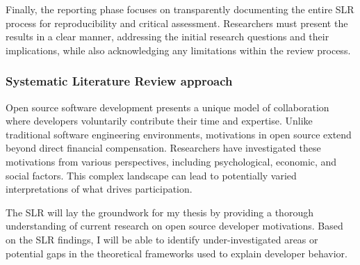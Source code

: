 Finally, the reporting phase focuses on transparently documenting the entire SLR process for reproducibility and critical assessment. Researchers must present the results in a clear manner, addressing the initial research questions and their implications, while also acknowledging any limitations within the review process.

\subsubsection{Systematic Literature Review approach}

Open source software development presents a unique model of collaboration where developers voluntarily contribute their time and expertise. Unlike traditional software engineering environments, motivations in open source extend beyond direct financial compensation. Researchers have investigated these motivations from various perspectives, including psychological, economic, and social factors. This complex landscape can lead to potentially varied interpretations of what drives participation.

The SLR will lay the groundwork for my thesis by providing a thorough understanding of current research on open source developer motivations. Based on the SLR findings, I will be able to identify under-investigated areas or potential gaps in the theoretical frameworks used to explain developer behavior.


\clearpage  %


